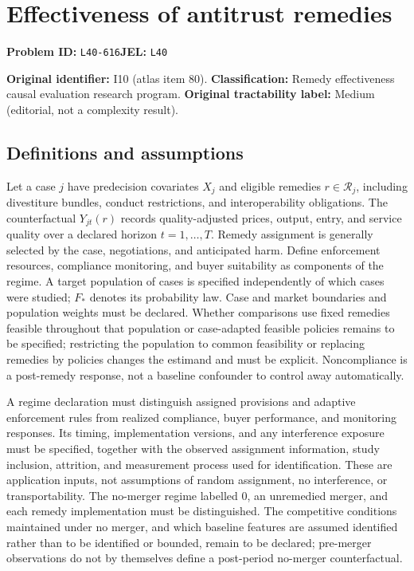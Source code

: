 \documentclass[11pt,a4paper]{article}
\begin{document}
\section*{Effectiveness of antitrust remedies}
\textbf{Problem ID:} \texttt{L40-616}\quad \textbf{JEL:} \texttt{L40}\par
\label{problem:OP-0080}
\label{atlas:prob:I10}

\noindent\textbf{Original identifier:} I10 (atlas item 80). \textbf{Classification:} Remedy effectiveness causal evaluation research program. \textbf{Original tractability label:} Medium (editorial, not a complexity result).

\subsection*{Definitions and assumptions}

Let a case $j$ have predecision covariates $X_j$ and eligible remedies $r\in\mathcal R_j$, including divestiture bundles, conduct restrictions, and interoperability obligations. The counterfactual $Y_{jt}(r)$ records quality-adjusted prices, output, entry, and service quality over a declared horizon $t=1,\ldots,T$. Remedy assignment is generally selected by the case, negotiations, and anticipated harm. Define enforcement resources, compliance monitoring, and buyer suitability as components of the regime. A target population of cases is specified independently of which cases were studied; $F_*$ denotes its probability law. Case and market boundaries and population weights must be declared. Whether comparisons use fixed remedies feasible throughout that population or case-adapted feasible policies remains to be specified; restricting the population to common feasibility or replacing remedies by policies changes the estimand and must be explicit. Noncompliance is a post-remedy response, not a baseline confounder to control away automatically.

A regime declaration must distinguish assigned provisions and adaptive enforcement rules from realized compliance, buyer performance, and monitoring responses. Its timing, implementation versions, and any interference exposure must be specified, together with the observed assignment information, study inclusion, attrition, and measurement process used for identification. These are application inputs, not assumptions of random assignment, no interference, or transportability. The no-merger regime labelled $0$, an unremedied merger, and each remedy implementation must be distinguished. The competitive conditions maintained under no merger, and which baseline features are assumed identified rather than to be identified or bounded, remain to be declared; pre-merger observations do not by themselves define a post-period no-merger counterfactual.
\end{document}

